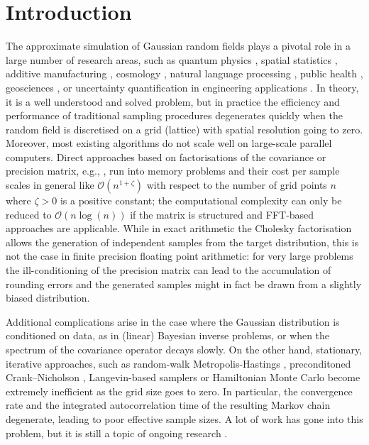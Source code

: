 \documentclass[11pt,english]{article}
\theoremstyle{plain}
\theoremstyle{plain}
\theoremstyle{plain}
\theoremstyle{plain}
\numberwithin{equation}{section}
\newcommand{\rev}[1]{#1}
\begin{document}
\section{Introduction}
The approximate simulation of Gaussian random fields plays a pivotal role in a large number of research areas, such as quantum physics \cite{goodman1989multigrid,edwards1992multi}, spatial statistics \cite{LindgrenEtAl.F_2011_ExplicitLinkGaussian}, additive manufacturing \cite{ZhangEtAl.H_2021_StochasticModelingGeometrical}, cosmology \cite{Marinucci.D_2011_book}, natural language processing \cite{inoue-etal-2022-infinite}, public health \cite{MannsethEtAl.J_2021_VariationUseCaesarean}, geosciences \cite{LiuEtAl.Y_2019_AdvancesGaussianRandom}, or uncertainty quantification in engineering applications \cite{Soize.C_2017_UncertaintyQuantificationAccelerated,VasileEtAl.M_2021_AdvancesUncertaintyQuantification}. In theory, it is a well understood and solved problem, but in practice the efficiency and performance of traditional sampling procedures degenerates quickly when the random field is discretised on a grid (lattice) with spatial resolution going to zero. Moreover, most existing algorithms do not scale well on large-scale parallel computers.  Direct approaches based on factorisations of the covariance or precision matrix, e.g., \cite{rue2001fast,rue2005gaussian}, run into memory problems and their cost per sample scales in general like $\mathcal{O}(n^{1+\zeta})$ with respect to the number of grid points $n$ where $\zeta>0$ is a positive constant; the computational complexity can only be reduced to $\mathcal{O}(n\log(n))$ if the matrix is structured and FFT-based approaches are applicable. \rev{While in exact arithmetic the Cholesky factorisation allows the generation of independent samples from the target distribution, this is not the case in finite precision floating point arithmetic: for very large problems the ill-conditioning of the precision matrix can lead to the accumulation of rounding errors and the generated samples might in fact be drawn from a slightly biased distribution.}

Additional complications arise in the case where the Gaussian distribution is conditioned on data, as in (linear) Bayesian inverse problems, or when the spectrum of the covariance operator decays slowly. On the other hand, stationary, iterative approaches, such as random-walk Metropolis-Hastings \cite{metropolis1953,hastings1970}, preconditoned Crank--Nicholson \cite{cotter2013mcmc}, Langevin-based samplers \cite{roberts1996exponential} or Hamiltonian Monte Carlo \cite{duane1987216} become extremely inefficient as the grid size goes to zero. In particular, the convergence rate and the integrated autocorrelation time of the resulting Markov chain degenerate, leading to poor effective sample sizes. A lot of work has gone into this problem, but it is still a topic of  ongoing research \cite{LindgrenEtAl.F_2011_ExplicitLinkGaussian,LiuEtAl.Y_2019_AdvancesGaussianRandom,LangEtAl.A_2011_FastSimulationGaussian,Croci.M_etal_2018_EfficientWhiteNoise,FeischlEtAl.M_2018_FastRandomField, BachmayrEtAl.M_2020_UnifiedAnalysisPeriodizationBased,BolinEtAl.D_2020_RationalSPDEApproach,KressnerEtAl.D_2020_CertifiedFastComputations,LindgrenEtAl.F_2022_SPDEApproachGaussian}.
\end{document}
